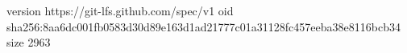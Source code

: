 version https://git-lfs.github.com/spec/v1
oid sha256:8aa6dc001fb0583d30d89e163d1ad21777c01a31128fc457eeba38e8116bcb34
size 2963
